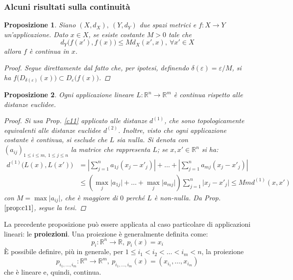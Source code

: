 \documentclass[12pt]{scrartcl}
\theoremstyle{style}
\newtheorem{prop}{Proposizione}[section]
\numberwithin{equation}{subsection}
\renewcommand{\textbf}[1]{\textsf{\bfseries #1}}
\begin{document}
\subsubsection{Alcuni risultati sulla continuit\`a}
\begin{prop}
Siano $(X,d_X), \ (Y,d_Y)$ due spazi metrici e $f:X\to Y$ un'applicazione. Dato $x \in X$, se esiste costante $M>0$ tale che
\[
d_Y\big(f(x'), f(x)\big) \le Md_X(x',x), \ \forall x ' \in X
\] 
allora $f$ \`e continua in $x$.
\begin{proof}
	Segue direttamente dal fatto che, per ipotesi, definendo $\delta (\varepsilon ) = \varepsilon / M$, si ha $f\big(D_{\delta (\varepsilon )} (x)\big) \subset D_\varepsilon \big(f(x)\big)$.
\end{proof}
\end{prop}
\begin{prop}
	Ogni applicazione lineare $L : \mathbb{R}^n \to \mathbb{R}^m$ \`e continua rispetto alle distanze euclidee.
	\begin{proof}
		Si usa Prop. \ref{c11} applicato alle distanze $d^{(1)} $, che sono topologicamente equivalenti alle distanze euclidee $d^{(2)} $. Inoltre, visto che ogni applicazione costante \`e continua, si esclude che $L$ sia nulla. Si denota con $(a_{ij} )_{1\le i\le m, \ 1\le j\le n} $ la matrice che rappresenta $L$; se $x, x' \in \mathbb{R}^n$ si ha:
		\[
			\begin{split}
				d^{(1)} \big(L(x) , L(x')\big)&= \left\lvert \sum_{j=1}^{n} a_{1j} (x_j-x'_j) \right\rvert + \ldots+ \left\lvert  \sum_{j=1}^{n} a_{mj} (x_j - x'_j) \right\rvert \\
						       &\le \left(\max_j \lvert a_{1j} \rvert+ \ldots +\max_j \lvert a_{mj}  \rvert   \right) \sum_{j=1}^{n} \lvert x_j - x'_j \rvert \le  Mm d^{(1)} (x,x')
			\end{split}
		\] 
		con $M=\max \lvert a_{ij}  \rvert$, che \`e maggiore di $0$ perch\'e $L$ \`e non-nulla. Da Prop. $\ref{prop:c11}$, segue la tesi.
	\end{proof}
\end{prop}
\noindent La precedente proposizione pu\`o essere applicata al caso particolare di applicazioni lineari: le \textbf{proiezioni}. Una proiezione \`e generalmente definita come:
\begin{equation}
	p_i:\mathbb{R}^n \to \mathbb{R}, \ p_i(x) = x_i
\end{equation}
\`E possibile definire, pi\`u in generale, per $1\le i_1 < i_2< \ldots<i_m <n$, la proiezione
\begin{equation}
	p_{i_1,\ldots,i_m}:\mathbb{R}^n \to \mathbb{R}^m, \  p_{i_1,\ldots,i_m} (x) = (x_{i_1} ,\ldots,x_{i_m} )
\end{equation}
che \`e lineare e, quindi, continua.
\end{document}
